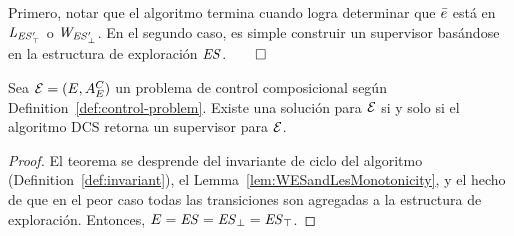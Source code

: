 Primero, notar que el algoritmo termina cuando logra determinar que $\bar{e}$ está en $\mathit{L_{\mathit{\mathit{ES}'_{\top}}}}$ o $\mathit{W_{\mathit{\mathit{ES}'_{\bot}}}}$. En el segundo caso, es simple construir un supervisor basándose en la estructura de exploración
$\mathit{ES}$.\hfill$\qed$

\begin{theorem}
Sea $\mathcal{E} = (E,A_E^C)$ un problema de control composicional según Definition~\ref{def:control-problem}. Existe una solución para $\mathcal{E}$ si y solo si el algoritmo DCS retorna un supervisor para $\mathcal{E}$.
\end{theorem}

\begin{proof}
El teorema se desprende del invariante de ciclo del algoritmo (Definition~\ref{def:invariant}), el
Lemma~\ref{lem:WESandLesMonotonicity}, y el hecho de que en el peor caso todas las transiciones son agregadas a la estructura de exploración. Entonces,  $E = \mathit{ES} = 
\mathit{\mathit{ES}_{\bot}} = \mathit{\mathit{ES}_{\top}}$.
\end{proof}
